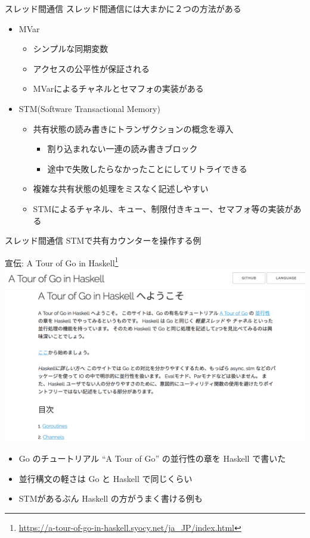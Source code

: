 \documentclass[unicode,12pt]{beamer}
\begin{document}
\begin{frame}{スレッド間通信}
  スレッド間通信には大まかに２つの方法がある
  \begin{itemize}
  \item MVar
    \begin{itemize}
    \item シンプルな同期変数
    \item アクセスの\alert{公平性}が保証される
    \item MVarによるチャネルとセマフォの実装がある
    \end{itemize}
  \item STM(Software Transactional Memory)
    \begin{itemize}
    \item 共有状態の読み書きに\alert{トランザクション}の概念を導入
      \begin{itemize}
      \item 割り込まれない一連の読み書きブロック
      \item 途中で失敗したらなかったことにしてリトライできる
      \end{itemize}
      \item 複雑な共有状態の処理をミスなく記述しやすい
    \item STMによるチャネル、キュー、制限付きキュー、セマフォ等の実装がある
    \end{itemize}
  \end{itemize}
\end{frame}

\begin{frame}{スレッド間通信}
  STMで共有カウンターを操作する例
  
\end{frame}

\begin{frame}{宣伝: A Tour of Go in Haskell\footnote{\url{https://a-tour-of-go-in-haskell.syocy.net/ja_JP/index.html}}}
  \centering
  \includegraphics[width=.55\textwidth]{pic/a_tour_of_go_in_haskell.png}
  \begin{itemize}
  \item Go のチュートリアル ``A Tour of Go'' の並行性の章を Haskell で書いた
  \item 並行構文の軽さは Go と Haskell で同じくらい
  \item STMがあるぶん Haskell の方がうまく書ける例も
  \end{itemize}
\end{frame}
\end{document}
